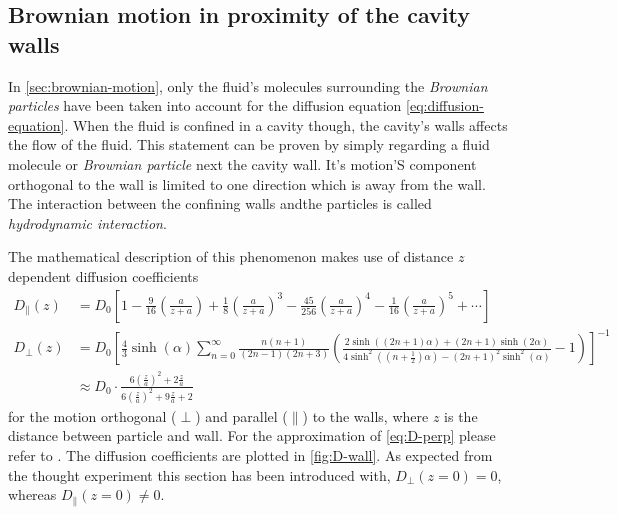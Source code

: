 \documentclass[.../bericht]{subfilies}
\begin{document}
      \subsection{Brownian motion in proximity of the cavity walls}
      \label{subsec:brownian-wall}

        In \cref{sec:brownian-motion}, only the fluid's molecules surrounding the \textit{Brownian particles} have been taken into account for the diffusion equation \cref{eq:diffusion-equation}. When the fluid is confined in a cavity though, the cavity's walls affects the flow of the fluid. This statement can be proven by simply regarding a fluid molecule or \textit{Brownian particle} next the cavity wall. It's motion'S component orthogonal to the wall is limited to one direction which is away from the wall. The interaction between the confining walls andthe particles is called \textit{hydrodynamic interaction}.

        The mathematical description of this phenomenon makes use of distance $z$ dependent diffusion coefficients
        \begin{align}
          D_\parallel(z)&=D_0\left[ 1- \frac{9}{16} \left( \frac{a}{z+a}\right) + \frac{1}{8} \left( \frac{a}{z+a}\right)^3 - \frac{45}{256}\left( \frac{a}{z+a}\right)^4- \frac{1}{16}\left( \frac{a}{z+a}\right)^5+\cdots \right] \label{eq:D-parallel} \\
          D_\perp(z)&=D_0\left[ \frac{4}{3}\sinh (\alpha ) \sum_{n=0}^{\infty} \frac{n(n+1)}{(2n-1)(2n+3)}\left( \frac{2\sinh ((2n+1)\alpha )+(2n+1)\sinh (2\alpha )}{4\sinh^2 ((n+ \frac{1}{2})\alpha)-(2n+1)^2 \sinh^2 (\alpha )} - 1 \right) \right]^{-1} \nonumber \\
          &\approx D_0\cdot \frac{6 \left( \frac{z}{a}\right)^2 + 2 \frac{z}{a}}{6\left( \frac{z}{a}\right)^2 + 9 \frac{z}{a} + 2} \label{eq:D-perp}
        \end{align}
         for the motion orthogonal ($\perp$) and parallel ($\parallel$) to the walls, where $z$ is the distance between particle and wall. For the approximation of \cref{eq:D-perp} please refer to \cite{beavan}. The diffusion coefficients are plotted in \cref{fig:D-wall}. As expected from the thought experiment this section has been introduced with, $D_\perp (z=0)=0$, whereas $D_\parallel (z=0)\ne 0$. \cite{helden}
\end{document}

